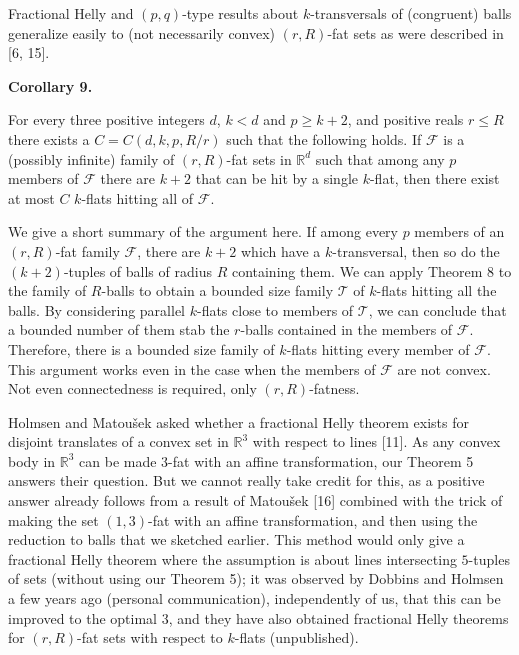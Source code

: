 \documentclass[10pt,a4paper]{amsart}
\begin{document}
\par
\par
Fractional Helly and $(p,q)$-type results about $k$-transversals of (congruent) balls generalize easily to (not necessarily convex) $(r,R)$-fat sets as were described in [6, 15].
\par
\par
\par\medskip\noindent\textbf{Corollary 9.}\par
For every three positive integers $d$, $k<d$ and $p\geq k+2$, and positive reals $r\leq R$ there exists a $C=C(d,k,p,R/r)$ such that the following holds. If $\mathcal{F}$ is a (possibly infinite) family of $(r,R)$-fat sets in $\mathbb{R}^{d}$ such that among any $p$ members of $\mathcal{F}$ there are $k+2$ that can be hit by a single $k$-flat, then there exist at most $C$ $k$-flats hitting all of $\mathcal{F}$.
\par
\par
\par
We give a short summary of the argument here. If among every $p$ members of an $(r,R)$-fat family $\mathcal{F}$, there are $k+2$ which have a $k$-transversal, then so do the $(k+2)$-tuples of balls of radius $R$ containing them. We can apply Theorem 8 to the family of $R$-balls to obtain a bounded size family $\mathcal{T}$ of $k$-flats hitting all the balls. By considering parallel $k$-flats close to members of $\mathcal{T}$, we can conclude that a bounded number of them stab the $r$-balls contained in the members of $\mathcal{F}$. Therefore, there is a bounded size family of $k$-flats hitting every member of $\mathcal{F}$. This argument works even in the case when the members of $\mathcal{F}$ are not convex. Not even connectedness is required, only $(r,R)$-fatness.
\par
\par
Holmsen and Matoušek asked whether a fractional Helly theorem exists for disjoint translates of a convex set in $\mathbb{R}^{3}$ with respect to lines [11]. As any convex body in $\mathbb{R}^{3}$ can be made $3$-fat with an affine transformation, our Theorem 5 answers their question. But we cannot really take credit for this, as a positive answer already follows from a result of Matoušek [16] combined with the trick of making the set $(1,3)$-fat with an affine transformation, and then using the reduction to balls that we sketched earlier. This method would only give a fractional Helly theorem where the assumption is about lines intersecting $5$-tuples of sets (without using our Theorem 5); it was observed by Dobbins and Holmsen a few years ago (personal communication), independently of us, that this can be improved to the optimal $3$, and they have also obtained fractional Helly theorems for $(r,R)$-fat sets with respect to $k$-flats (unpublished).
\end{document}
